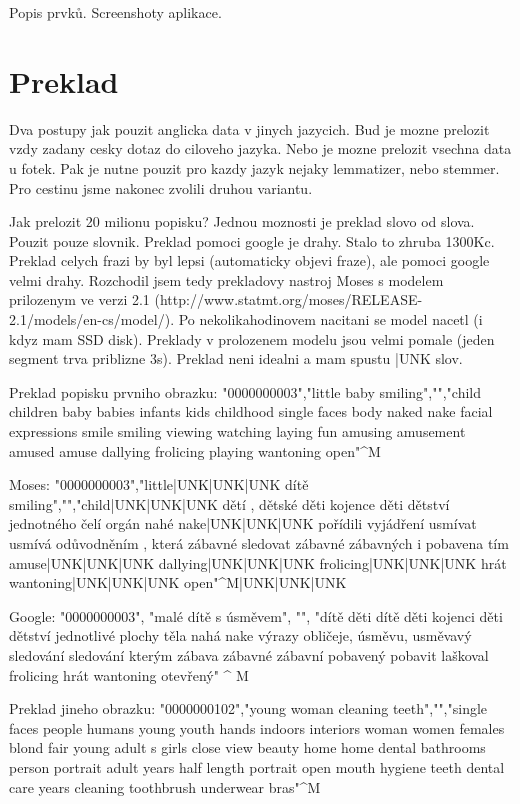 Popis prvků. Screenshoty aplikace.

\section{Preklad}

Dva postupy jak pouzit anglicka data v jinych jazycich. Bud je mozne prelozit vzdy zadany cesky dotaz do ciloveho jazyka. Nebo je mozne prelozit vsechna data u fotek. Pak je nutne pouzit pro kazdy jazyk nejaky lemmatizer, nebo stemmer. Pro cestinu jsme nakonec zvolili druhou variantu.

Jak prelozit 20 milionu popisku? Jednou moznosti je preklad slovo od slova. Pouzit pouze slovnik. Preklad pomoci google je drahy. Stalo to zhruba 1300Kc. Preklad celych frazi by byl lepsi (automaticky objevi fraze), ale pomoci google velmi drahy. Rozchodil jsem tedy prekladovy nastroj Moses s modelem prilozenym ve verzi 2.1 (http://www.statmt.org/moses/RELEASE-2.1/models/en-cs/model/). Po nekolikahodinovem nacitani se model nacetl (i kdyz mam SSD disk). Preklady v prolozenem modelu jsou velmi pomale (jeden segment trva priblizne 3s). Preklad neni idealni a mam spustu |UNK slov.

Preklad popisku prvniho obrazku:
"0000000003","little baby smiling","","child children baby babies infants kids childhood single faces body naked nake facial expressions smile smiling viewing watching laying fun amusing amusement amused amuse dallying frolicing playing wantoning open"^M

Moses:
"0000000003","little|UNK|UNK|UNK dítě smiling","","child|UNK|UNK|UNK dětí , dětské děti kojence děti dětství jednotného čelí orgán nahé nake|UNK|UNK|UNK pořídili vyjádření usmívat usmívá odůvodněním , která zábavné sledovat zábavné zábavných i pobavena tím amuse|UNK|UNK|UNK dallying|UNK|UNK|UNK frolicing|UNK|UNK|UNK hrát wantoning|UNK|UNK|UNK open"^M|UNK|UNK|UNK

Google:
"0000000003", "malé dítě s úsměvem", "", "dítě děti dítě děti kojenci děti dětství jednotlivé plochy těla nahá nake výrazy obličeje, úsměvu, usměvavý sledování sledování kterým zábava zábavné zábavní pobavený pobavit laškoval frolicing hrát wantoning otevřený" ^ M

Preklad jineho obrazku:
"0000000102","young woman cleaning teeth","","single faces people humans young youth hands indoors interiors woman women females blond fair young adult s girls close view beauty home home dental bathrooms person portrait adult years half length portrait open mouth hygiene teeth dental care years cleaning toothbrush underwear bras"^M

